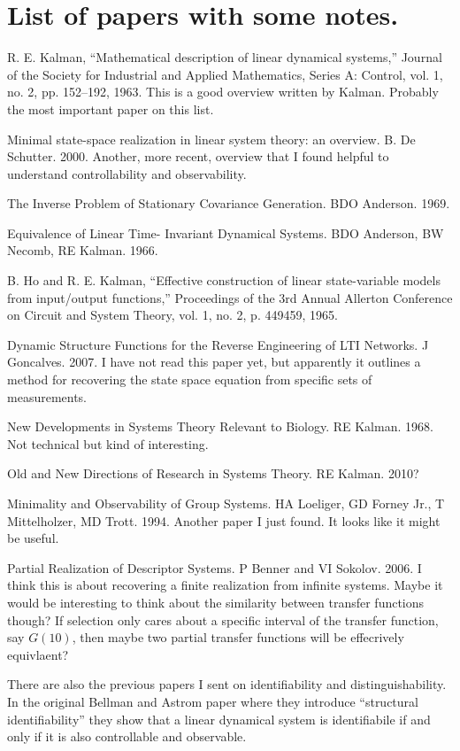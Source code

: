 \documentclass[11 pt]{article}
\begin{document}
\section{List of papers with some notes.}

R. E. Kalman, “Mathematical description of linear dynamical systems,” Journal of the Society for Industrial and Applied Mathematics, Series A: Control, vol. 1, no. 2, pp. 152–192, 1963.
This is a good overview written by Kalman. Probably the most important paper on this list.

Minimal state-space realization in linear system theory: an overview. B. De Schutter. 2000.
Another, more recent, overview that I found helpful to understand controllability and observability. 

The Inverse Problem of Stationary Covariance Generation. BDO Anderson. 1969.

Equivalence of Linear Time- Invariant Dynamical Systems. BDO Anderson, BW Necomb, RE Kalman. 1966. 

B. Ho and R. E. Kalman, “Effective construction of linear state-variable models from input/output functions,” Proceedings of the 3rd Annual Allerton Conference on Circuit and System Theory, vol. 1, no. 2, p. 449459, 1965.

Dynamic Structure Functions for the Reverse Engineering of LTI Networks. J Goncalves. 2007.
I have not read this paper yet, but apparently it outlines a method for recovering the state space equation from specific sets of measurements.

New Developments in Systems Theory Relevant to Biology. RE Kalman. 1968.
Not technical but kind of interesting. 

Old and New Directions of Research in Systems Theory. RE Kalman. 2010?

Minimality and Observability of Group Systems. HA Loeliger, GD Forney Jr., T Mittelholzer, MD Trott. 1994. 
Another paper I just found. It looks like it might be useful.

Partial Realization of Descriptor Systems. P Benner and VI Sokolov. 2006. 
I think this is about recovering a finite realization from infinite systems. Maybe it would be interesting to think about the similarity between transfer functions though? If selection only cares about a specific interval of the transfer function, say $G(10)$, then maybe two partial transfer functions will be effecrively equivlaent? 

There are also the previous papers I sent on identifiability and distinguishability. In the original Bellman and Astrom paper where they introduce ``structural identifiability'' they show that a linear dynamical system is identifiabile if and only if it is also controllable and observable. 
\end{document}
